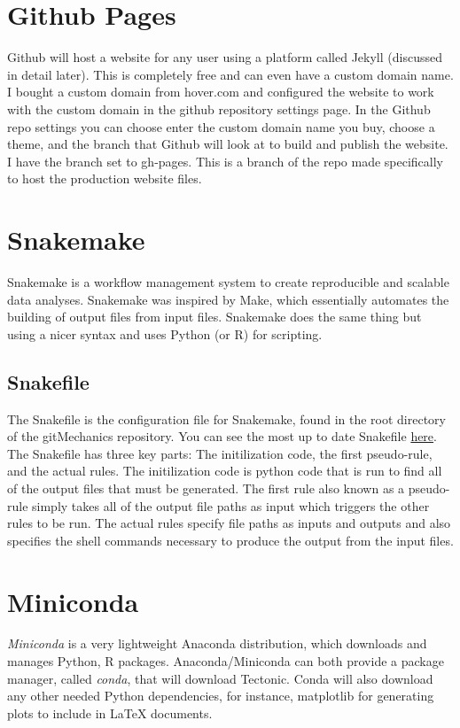 \documentclass[landscape, twocolumn, 12pt]{article}
\begin{document}
\section{Github Pages}
Github will host a website for any user using a platform called Jekyll (discussed in detail later). This is completely free and can even have a custom domain name. I bought a custom domain from hover.com and configured the website to work with the custom domain in the github repository settings page. In the Github repo settings you can choose enter the custom domain name you buy, choose a theme, and the branch that Github will look at to build and publish the website. I have the branch set to gh-pages. This is a branch of the repo made specifically to host the production website files. 



\section{Snakemake}
Snakemake is a workflow management system to create reproducible and scalable data analyses. Snakemake was inspired by Make, which essentially automates the building of output files from input files. Snakemake does the same thing but using a nicer syntax and uses Python (or R) for scripting.

\subsection{Snakefile}
The Snakefile is the configuration file for Snakemake, found in the root directory of the gitMechanics repository. You can see the most up to date Snakefile \href{http://www.gitmechanics.com/Snakefile}{here}. The Snakefile has three key parts: The initilization code, the first pseudo-rule, and the actual rules. The initilization code is python code that is run to find all of the output files that must be generated. The first rule also known as a pseudo-rule simply takes all of the output file paths as input which triggers the other rules to be run. The actual rules specify file paths as inputs and outputs and also specifies the shell commands necessary to produce the output from the input files.

\section{Miniconda}
\textit{Miniconda} is a very lightweight Anaconda distribution, which downloads and manages Python, R packages. Anaconda/Miniconda can both provide a package manager, called \textit{conda}, that will download Tectonic. Conda will also download any other needed Python dependencies, for instance, matplotlib for generating plots to include in \LaTeX{} documents.
\end{document}
